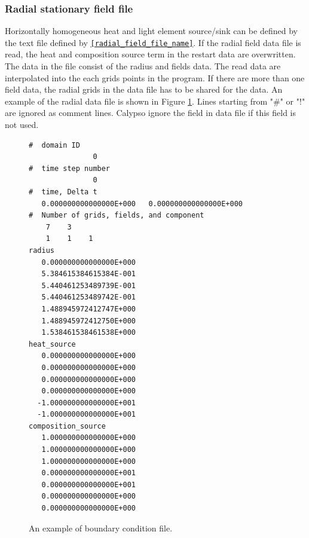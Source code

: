 \subsubsection{Radial stationary field file}\label{sec:radial_field_file}
Horizontally homogeneous heat and light element source/sink can be defined by the text file defined by  \hyperref[href_t:radial_field_file_name]{\tt [radial\_field\_file\_name]}. If the radial field data file is read, the heat and composition source term in the restart data are overwritten. The data in the file consist of the radius and fields data. The read data are interpolated into the each grids points in the program. If there are more than  one field data, the radial grids in the data file has to be shared for the data. An example of the radial data file is shown in Figure \ref{fig:radial_field_file}. Lines starting from "\#" or "!" are ignored as comment lines. Calypso ignore the field in data file if this field is not used. 
%
\begin{figure}[htbp]
\begin{center}
{\small
\begin{verbatim}
#  domain ID
               0
#  time step number
               0
#  time, Delta t
   0.000000000000000E+000   0.000000000000000E+000
#  Number of grids, fields, and component
    7    3
    1    1    1
radius
   0.000000000000000E+000
   5.384615384615384E-001
   5.440461253489739E-001
   5.440461253489742E-001
   1.488945972412747E+000
   1.488945972412750E+000
   1.538461538461538E+000
heat_source
   0.000000000000000E+000
   0.000000000000000E+000
   0.000000000000000E+000
   0.000000000000000E+000
  -1.000000000000000E+001
  -1.000000000000000E+001
composition_source
   1.000000000000000E+000
   1.000000000000000E+000
   1.000000000000000E+000
   0.000000000000000E+001
   0.000000000000000E+001
   0.000000000000000E+000
   0.000000000000000E+000
\end{verbatim}
}
\end{center}
\caption{An example of boundary condition file.}
\label{fig:radial_field_file}
\end{figure}
%
